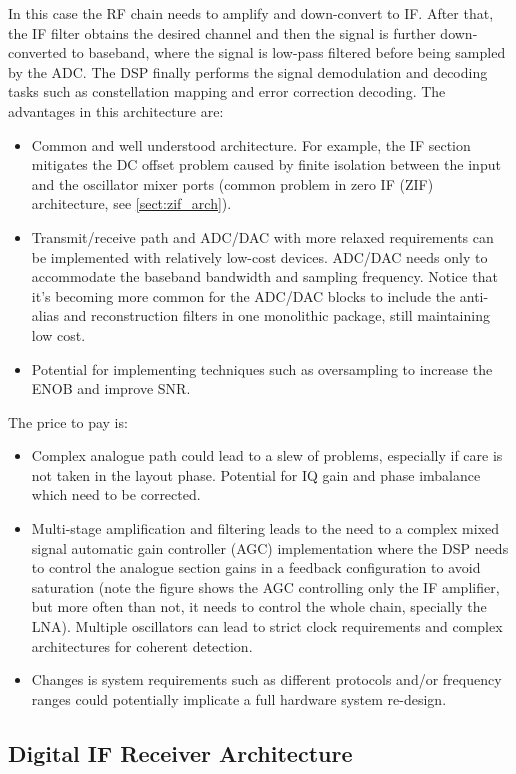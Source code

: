 In this case the RF chain needs to amplify and down-convert to IF. After that, the IF filter obtains the desired channel and then the signal is further down-converted to baseband, where the signal is low-pass filtered before being sampled by the ADC. The DSP finally performs the signal demodulation and decoding tasks such as constellation mapping and error correction decoding. The advantages in this architecture are:
\begin{itemize}
  \item Common and well understood architecture. For example, the IF section mitigates the DC offset problem caused by finite isolation between the input and the oscillator mixer ports (common problem in zero IF (ZIF) architecture, see \autoref{sect:zif_arch}).
  \item Transmit/receive path and ADC/DAC with more relaxed requirements can be implemented with relatively low-cost devices. ADC/DAC needs only to accommodate the baseband bandwidth and sampling frequency. Notice that it's becoming more common for the ADC/DAC blocks to include the anti-alias and reconstruction filters in one monolithic package, still maintaining low cost.
  \item Potential for implementing techniques such as oversampling to increase the ENOB and improve SNR.
\end{itemize}

The price to pay is:
\begin{itemize}
  \item Complex analogue path could lead to a slew of problems, especially if care is not taken in the layout phase. Potential for IQ gain and phase imbalance which need to be corrected.
  \item  Multi-stage amplification and filtering leads to the need to a complex mixed signal automatic gain controller (AGC) implementation where the DSP needs to control the analogue section gains in a feedback configuration to avoid saturation (note the figure shows the AGC controlling only the IF amplifier, but more often than not, it needs to control the whole chain, specially the LNA). Multiple oscillators can lead to strict clock requirements and complex architectures for coherent detection.
  \item Changes is system requirements such as different protocols and/or frequency ranges could potentially implicate a full hardware system re-design.
\end{itemize}

\subsection{Digital IF Receiver Architecture}

